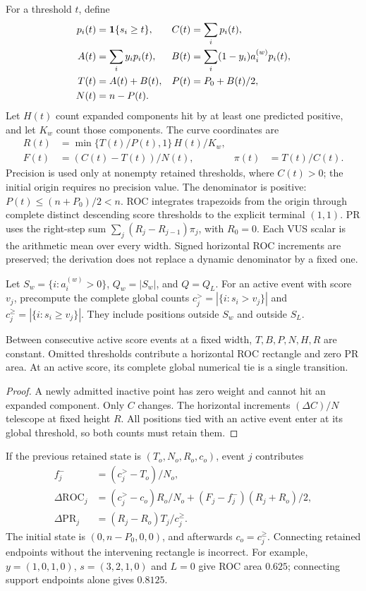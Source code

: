 For a threshold $t$, define
\begin{align}
 p_i(t)&=\mathbf{1}\{s_i\ge t\}, & C(t)&=\sum_i p_i(t),\\
 A(t)&=\sum_i y_i p_i(t), &
 B(t)&=\sum_i(1-y_i)a_i^{(w)}p_i(t),\\
 T(t)&=A(t)+B(t), & P(t)&=P_0+B(t)/2,\\
 N(t)&=n-P(t).
\end{align}
Let $H(t)$ count expanded components hit by at least one predicted positive,
and let $K_w$ count those components. The curve coordinates are
\begin{align}
 R(t)&=\min\{T(t)/P(t),1\}\,H(t)/K_w,\\
 F(t)&=(C(t)-T(t))/N(t), & \pi(t)&=T(t)/C(t).
\end{align}
Precision is used only at nonempty retained thresholds, where $C(t)>0$;
the initial origin requires no precision value.
The denominator is positive: $P(t)\le(n+P_0)/2<n$. ROC integrates trapezoids
from the origin through complete distinct descending score thresholds to
the explicit terminal $(1,1)$. PR uses the right-step sum
$\sum_j(R_j-R_{j-1})\pi_j$, with $R_0=0$. Each VUS scalar is the arithmetic
mean over every width. Signed horizontal ROC increments are preserved; the
derivation does not replace a dynamic denominator by a fixed one.

Let $S_w=\{i:a_i^{(w)}>0\}$, $Q_w=|S_w|$, and $Q=Q_L$. For an active event
with score $v_j$, precompute the complete global counts
$c_j^>=|\{i:s_i>v_j\}|$ and $c_j^\ge=|\{i:s_i\ge v_j\}|$. They include
positions outside $S_w$ and outside $S_L$.

\begin{lemma}
Between consecutive active score events at a fixed width, $T,B,P,N,H,R$
are constant. Omitted thresholds contribute a horizontal ROC rectangle and
zero PR area. At an active score, its complete global numerical tie is a
single transition.
\end{lemma}
\begin{proof}
A newly admitted inactive point has zero weight and cannot hit an expanded
component. Only $C$ changes. The horizontal increments
$(\Delta C)/N$ telescope at fixed height $R$. All positions tied with an
active event enter at its global threshold, so both counts must retain them.
\end{proof}

If the previous retained state is $(T_o,N_o,R_o,c_o)$, event $j$ contributes
\begin{align}
 f_j^-&=(c_j^>-T_o)/N_o,\\
 \Delta\mathrm{ROC}_j&=
 (c_j^>-c_o)R_o/N_o+(F_j-f_j^-)(R_j+R_o)/2,\\
 \Delta\mathrm{PR}_j&=(R_j-R_o)T_j/c_j^\ge.
\end{align}
The initial state is $(0,n-P_0,0,0)$, and afterwards $c_o=c_j^\ge$.
Connecting retained endpoints without the intervening rectangle is
incorrect. For example, $y=(1,0,1,0)$, $s=(3,2,1,0)$ and $L=0$ give ROC
area $0.625$; connecting support endpoints alone gives $0.8125$.

